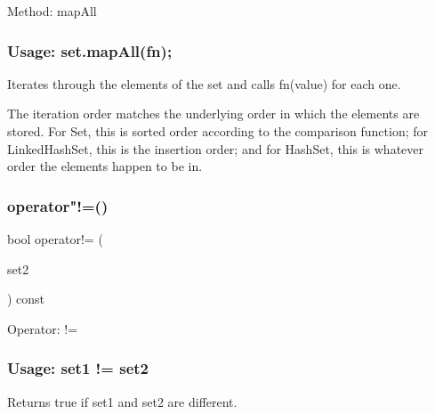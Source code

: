 Method\+: map\+All \subsubsection*{Usage\+: set.\+map\+All(fn); }

Iterates through the elements of the set and calls {\ttfamily fn(value)} for each one. 

The iteration order matches the underlying order in which the elements are stored. For Set, this is sorted order according to the comparison function; for Linked\+Hash\+Set, this is the insertion order; and for Hash\+Set, this is whatever order the elements happen to be in. \mbox{\label{classstanfordcpplib_1_1collections_1_1GenericSet_a2da26ab6a8320bed56ef83210a0addf8}} 
\subsubsection{\texorpdfstring{operator"!=()}{operator!=()}}
{\footnotesize\ttfamily bool operator!= (\begin{DoxyParamCaption}\item[{const \mbox{\hyperlink{classstanfordcpplib_1_1collections_1_1GenericSet}{Generic\+Set}}$<$ \mbox{\hyperlink{structstanfordcpplib_1_1collections_1_1SetTraits}{Set\+Traits}} $>$ \&}]{set2 }\end{DoxyParamCaption}) const}



Operator\+: != \subsubsection*{Usage\+: set1 != set2 }

Returns {\ttfamily true} if {\ttfamily set1} and {\ttfamily set2} are different. 

\mbox{\label{classstanfordcpplib_1_1collections_1_1GenericSet_a834d22cfc42c67b0243283c3bc02ce5e}} 
